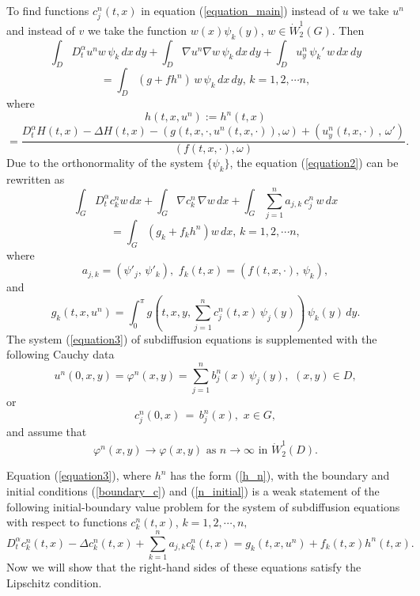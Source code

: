 \documentclass[12pt]{amsart}
\theoremstyle{definition}
\numberwithin{equation}{section}
\begin{document}
To find functions $c_j^n(t, x)$ in equation (\ref{equation_main}) instead of $u$ we take $u^n$ and instead of $v$ we take the function $w(x)\psi_k(y)$, $w\in \dot{W}^1_2(G)$. Then
\begin{equation}\label{equation2}
\int_D D_t^\alpha u^n w\, \psi_k\, dx\, dy + \int_D \nabla u^n \nabla w \, \psi_k\, dx\, dy + \int_D u^n_y  \, \psi_k'\,w\, dx\, dy 
\end{equation}
\[
= \int_D (g + f h^n)\, w \, \psi_k\, dx\, dy,\, k=1, 2, \cdots n,
\]
where 
\begin{equation}\label{h_n}
   h(t, x, u^n) := h^n(t, x)
    \end{equation}
    \[
    = \frac{D_t^{\alpha} H(t, x) -\Delta H(t, x)-(g(t, x, \cdot, u^n(t,x, \cdot)), \omega) + (u^n_y(t,x, \cdot)\, , \, \omega')}{(f(t, x, \cdot), \omega)}.
\]
Due to the orthonormality of the system $\{\psi_k\}$, the equation (\ref{equation2}) can be rewritten as
\begin{equation}\label{equation3}
\int_G  D_t^\alpha c_k^n w \, dx + \int_G \nabla c_k^n \, \nabla w \,  dx + \int_G \sum_{j=1}^n a_{j,k}\, c^n_j \, w\, dx  
\end{equation}
\[
= \int_G  (g_k + f_k h^n) w \, dx, \, k=1, 2, \cdots n,
\]
where
\[
a_{j,k} =   (\psi'_j,\, \psi'_k), \, \, f_k(t, x) =  (f (t, x, \cdot), \, \psi_k),
\]
and
\[
g_k(t, x, u^n) = \int_0^\pi  g(t, x, y, \sum_{j=1}^n c_j^n(t,x)\, \psi_j (y) )\, \psi_k(y)\, dy.
\]
The system (\ref{equation3}) of subdiffusion equations is supplemented with the following
Cauchy data
\[
u^n(0, x, y) = \varphi^n (x, y) = \sum_{j=1}^n b_j^n(x) \, \psi_j(y), \,\,  (x, y)\in D,
\]
or
\begin{equation}\label{n_initial}
  c_j^n(0, x) \, = \, b^n_j(x),   \,\, x\in G,
\end{equation}
and assume that 
\begin{equation}\label{n_initial_limit}
\varphi^n (x, y) \to \varphi(x, y)\, \, \text{as} \,\, n\to \infty \,\, \text{in}\,\, \dot{W}_2^1(D).
    \end{equation}

    Equation (\ref{equation3}), where $h^n$ has the form (\ref{h_n}), with the boundary and initial conditions (\ref{boundary_c}) and (\ref{n_initial}) is a weak statement of the following initial-boundary value problem for the system of subdiffusion equations with respect to functions $c_k^n (t, x)$, $ k=1, 2, \cdots,  n,$
    \begin{equation}\label{Cauchy}
      D_t^\alpha c_k^n (t, x)  - \Delta c_k^n (t, x) + \sum_{k=1}^n a_{j,k} c_k^n (t, x) = g_k (t, x, u^n) + f_k (t, x) h^n (t, x).
    \end{equation} 
    Now we will show that the right-hand sides of these equations satisfy the Lipschitz condition. 
    
\end{document}
